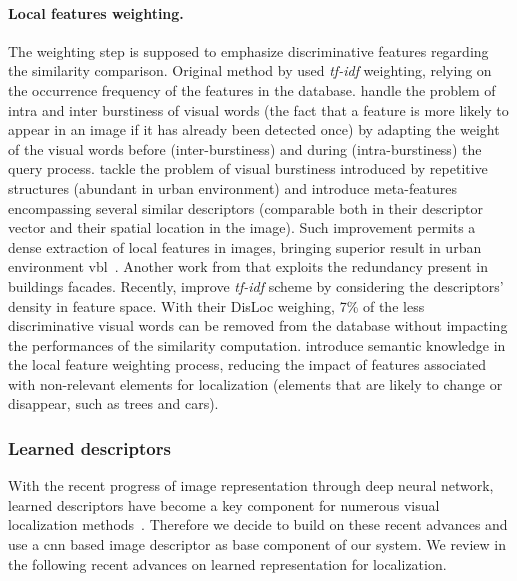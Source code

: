 \paragraph{Local features weighting.} The weighting step is supposed to emphasize discriminative features regarding the similarity comparison.	Original method by \citep{Sivic2003} used \textit{tf-idf} weighting, relying on the occurrence frequency of the features in the database. \citet{Jegou2009} handle the problem of intra and inter burstiness of visual words (\ie the fact that a feature is more likely to appear in an image if it has already been detected once) by adapting the weight of the visual words before (inter-burstiness) and during (intra-burstiness) the query process. \citet{Torii2013} tackle the problem of visual burstiness introduced by repetitive structures (abundant in urban environment) and introduce meta-features encompassing several similar descriptors (comparable both in their descriptor vector and their spatial location in the image). Such improvement permits a dense extraction of local features in images, bringing superior result in urban environment \ac{vbl}~\citep{Qu2016,Torii2015}. Another work from \citet{Morago2016} that exploits the redundancy present in buildings facades. Recently, \citet{Arandjelovic2014} improve \textit{tf-idf} scheme by considering the descriptors' density in feature space. With their DisLoc weighing, 7\% of the less discriminative visual words can be removed from the database without impacting the performances of the similarity computation. \citet{Mousavian2015} introduce semantic knowledge in the local feature weighting process, reducing the impact of features associated with non-relevant elements for localization (\ie elements that are likely to change or disappear, such as trees and cars).

\subsubsection{Learned descriptors} \label{subsec:cnn_as_global_desc}
With the recent progress of image representation through deep neural network, learned descriptors have become a key component for numerous visual localization methods~\cite{Sunderhauf2015a, Sattler2017a, Schonberger2017a, Sarlin2018, Sarlin2018a, Germain2019, Paulin2017}. Therefore we decide to build on these recent advances and use a \ac{cnn} based image descriptor as base component of our system.  We review in the following recent advances on learned representation for localization.

